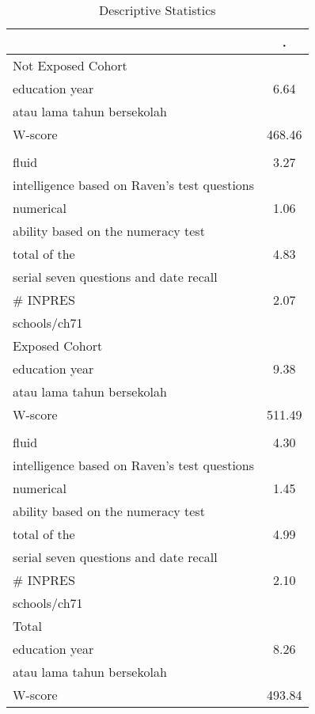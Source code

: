 \begin{table}[htbp]\centering
\caption{Descriptive Statistics}
\begin{tabular}{l*{1}{c}}
\toprule
                &        .\\
\midrule
Not Exposed Cohort&         \\
education year  &     6.64\\
atau lama tahun bersekolah&         \\
\addlinespace
W-score         &   468.46\\
                &         \\
\addlinespace
fluid           &     3.27\\
intelligence based on Raven's test questions&         \\
\addlinespace
numerical       &     1.06\\
ability based on the numeracy test&         \\
\addlinespace
total of the    &     4.83\\
serial seven questions and date recall&         \\
\addlinespace
# INPRES        &     2.07\\
schools/ch71    &         \\
\midrule
Exposed Cohort  &         \\
education year  &     9.38\\
atau lama tahun bersekolah&         \\
\addlinespace
W-score         &   511.49\\
                &         \\
\addlinespace
fluid           &     4.30\\
intelligence based on Raven's test questions&         \\
\addlinespace
numerical       &     1.45\\
ability based on the numeracy test&         \\
\addlinespace
total of the    &     4.99\\
serial seven questions and date recall&         \\
\addlinespace
# INPRES        &     2.10\\
schools/ch71    &         \\
\midrule
Total           &         \\
education year  &     8.26\\
atau lama tahun bersekolah&         \\
\addlinespace
W-score         &   493.84\\

\end{tabular}
\end{table}
